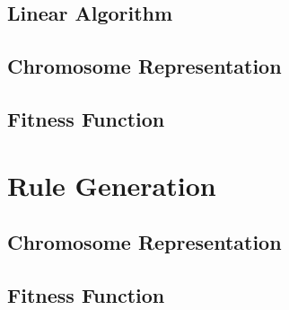 \subsection{Linear Algorithm}
\subsection{Chromosome Representation}
\subsection{Fitness Function}

\section{Rule Generation}
\subsection{Chromosome Representation}
\subsection{Fitness Function}